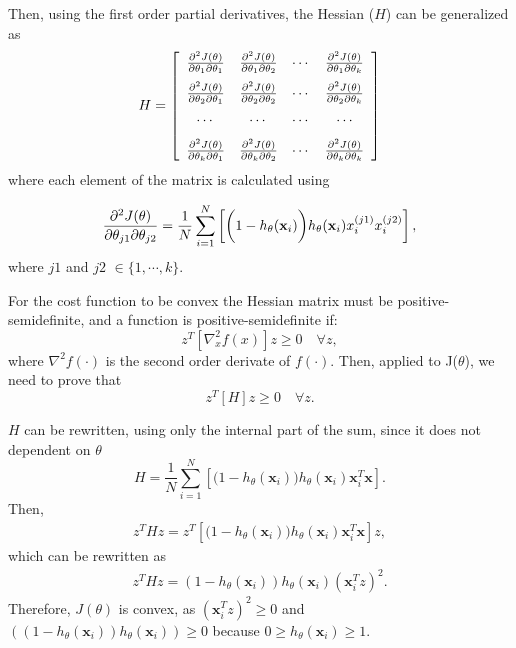Then, using the first order partial derivatives, the Hessian ($H$) can be generalized as
\begin{equation}
H=\left[ \begin{array}{cccc}
  \frac{\partial^2 J(\theta)}{\partial\theta_{1}\partial\theta_{1}} & \frac{\partial^2 J(\theta)}{\partial\theta_{1}\partial\theta_{2}} & \cdots & \frac{\partial^2 J(\theta)}{\partial\theta_{1}\partial\theta_{k}} \\[0.1in]  
  \frac{\partial^2 J(\theta)}{\partial\theta_{2}\partial\theta_{1}} & \frac{\partial^2 J(\theta)}{\partial\theta_{2}\partial\theta_{2}} & \cdots & \frac{\partial^2 J(\theta)}{\partial\theta_{2}\partial\theta_{k}} \\[0.1in]  
  \cdots & \cdots & \cdots & \cdots \\[0.1in]  
  \frac{\partial^2 J(\theta)}{\partial\theta_{k}\partial\theta_{1}} & \frac{\partial^2 J(\theta)}{\partial\theta_{k}\partial\theta_{2}} & \cdots & \frac{\partial^2 J(\theta)}{\partial\theta_{k}\partial\theta_{k}}  
\end{array} \right]
\end{equation}
where each element of the matrix is calculated using

\begin{equation}
  \frac{\partial^2 J(\theta)}{\partial\theta_{j1}\partial\theta_{j2}}=\frac{1}{N}\sum_{i=1}^{N}
  \left[\bigg(1-h_\theta(\mathbf{x}_i)\bigg)h_\theta(\mathbf{x}_i)x_i^{(j1)}x_i^{(j2)}\right],
\end{equation}
where $j1$ and $j2$ $\in \{1,\cdots,k\}$. 

For the cost function to be convex the Hessian matrix	must be positive-semidefinite, and
a function is positive-semidefinite if:  
\begin{equation}
  z^T\left[\nabla_x^2f(x)\right]z \ge 0 \quad  \forall z,
\end{equation}
where $\nabla^2f(\cdot)$ is the second order derivate of $f(\cdot)$. Then, applied to J($\theta$), 
we need to prove that
\begin{equation}\label{eq:7:pos1}
  z^T\left[H \right]z \ge 0 \quad  \forall z.
\end{equation}

$H$ can be rewritten, using only the internal part of the sum, since it does not 
dependent on $\theta$
\begin{equation}
 H = \frac{1}{N}\sum_{i=1}^{N} \left[ 
\bigg(1-h_\theta(\mathbf{x}_i)\bigg)h_\theta(\mathbf{x}_i)\mathbf{x}_i^T \mathbf{x} \right]. 
\end{equation}
Then, 
\begin{align}
  z^THz = z^T \left[\bigg(1-h_\theta(\mathbf{x}_i)\bigg)h_\theta(\mathbf{x}_i)\mathbf{x}_i^T 
\mathbf{x}\right] z,
\end{align}
which can be rewritten as
\begin{align}
  z^THz = (1-h_\theta(\mathbf{x}_i))h_\theta(\mathbf{x}_i)\left(\mathbf{x}_i^Tz\right)^2.
\end{align}
Therefore,  $J(\theta)$ is convex, as $\left(\mathbf{x}_i^Tz\right)^2 
\ge 0$ and \\ $\left((1-h_\theta(\mathbf{x}_i))h_\theta(\mathbf{x}_i)\right)\ge 0$ because $0\ge 
h_\theta(\mathbf{x}_i) \ge 1$.


